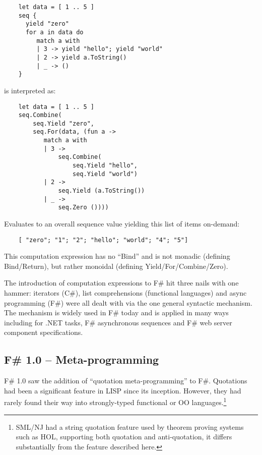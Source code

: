 \documentclass[acmsmall,review]{acmart}\settopmatter{printfolios=true,printccs=false,printacmref=false}
\begin{document}
\begin{verbatim}
    let data = [ 1 .. 5 ]
    seq {
      yield "zero"
      for a in data do
         match a with
         | 3 -> yield "hello"; yield "world"
         | 2 -> yield a.ToString() 
         | _ -> () 
    }
\end{verbatim}
is interpreted as:
\begin{verbatim}
    let data = [ 1 .. 5 ]
    seq.Combine(
        seq.Yield "zero",
        seq.For(data, (fun a ->
           match a with
           | 3 -> 
               seq.Combine(
                   seq.Yield "hello", 
                   seq.Yield "world")
           | 2 ->
               seq.Yield (a.ToString())
           | _ ->
               seq.Zero ())))
\end{verbatim}
Evaluates to an overall sequence value yielding this list of items on-demand:
\begin{verbatim}
    [ "zero"; "1"; "2"; "hello"; "world"; "4"; "5"] 
\end{verbatim}
This computation expression has no “Bind” and is not monadic (defining Bind/Return), but rather monoidal (defining Yield/For/Combine/Zero).  

The introduction of computation expressions to F\# hit three nails with one hammer: iterators (C\#), list comprehensions (functional languages) and async programming (F\#) were all dealt with via the one general syntactic mechanism.  The mechanism is widely used in F\# today and is applied in many ways including for .NET tasks, F\# asynchronous sequences and F\# web server component specifications.

\subsection*{F\# 1.0 – Meta-programming}

F\# 1.0 saw the addition of “quotation meta-programming” to F\#.  Quotations had been a significant feature in LISP since its inception. However, they had rarely 
found their way into strongly-typed functional or OO languages.\footnote{SML/NJ had a string quotation feature used by theorem proving systems such as HOL, supporting both quotation and anti-quotation, it differs substantially from the feature described here.}
\end{document}
